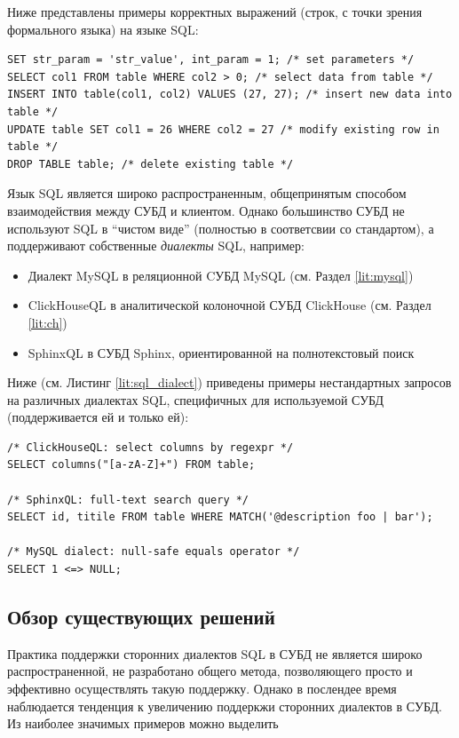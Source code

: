Ниже представлены примеры корректных выражений (строк, с точки зрения формального языка) на языке SQL:
\begin{code}
\label{lit:sql_ex}
\begin{verbatim}
SET str_param = 'str_value', int_param = 1; /* set parameters */
SELECT col1 FROM table WHERE col2 > 0; /* select data from table */
INSERT INTO table(col1, col2) VALUES (27, 27); /* insert new data into table */
UPDATE table SET col1 = 26 WHERE col2 = 27 /* modify existing row in table */
DROP TABLE table; /* delete existing table */
\end{verbatim}
\end{code}

Язык SQL является широко распространенным, общепринятым способом взаимодействия между СУБД и клиентом. Однако большинство СУБД не используют SQL в \enquote{чистом виде} (полностью в соответсвии со стандартом), а поддерживают собственные \textit{диалекты} SQL, например:
\begin{itemize}
    \item Диалект MySQL в реляционной CУБД MySQL (см. Раздел \ref{lit:mysql})
    \item ClickHouseQL в аналитической колоночной СУБД ClickHouse (см. Раздел \ref{lit:ch})
    \item SphinxQL в СУБД Sphinx, ориентированной на полнотекстовый поиск
\end{itemize}

Ниже (см. Листинг \ref{lit:sql_dialect}) приведены примеры нестандартных запросов на различных диалектах SQL, специфичных для используемой СУБД (поддерживается ей и только ей):

\begin{code}
\label{lit:sql_dialect}
\begin{verbatim}
/* ClickHouseQL: select columns by regexpr */ 
SELECT columns("[a-zA-Z]+") FROM table;

/* SphinxQL: full-text search query */
SELECT id, titile FROM table WHERE MATCH('@description foo | bar');

/* MySQL dialect: null-safe equals operator */
SELECT 1 <=> NULL;
\end{verbatim}
\end{code}

\subsection{Обзор существующих решений}
Практика поддержки сторонних диалектов SQL в СУБД не является широко распространенной, не разработано общего метода, позволяющего просто и эффективно осуществлять такую поддержку. Однако в послендее время наблюдается тенденция к увеличению поддеркжи сторонних диалектов в СУБД. Из наиболее значимых примеров можно выделить

